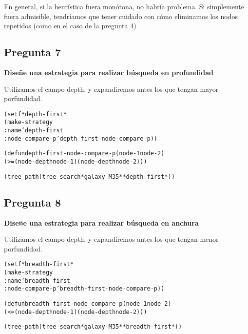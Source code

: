En general, si la heurística fuera monótona, no habría problema. Si simplemente fuera admisible, tendríamos que tener cuidado con cómo eliminamos los nodos repetidos (como en el caso de la pregunta 4)

\subsection*{Pregunta 7}\textbf{Diseñe una estrategia para realizar búsqueda en profundidad}

Utilizamos el campo depth, y expandiremos antes los que tengan mayor porfundidad.
\begin{alltt}
(setf *depth-first*
    (make-strategy
        :name 'depth-first
        :node-compare-p 'depth-first-node-compare-p))

(defun depth-first-node-compare-p (node-1 node-2)
    (>= (node-depth node-1) (node-depth node-2)))

(tree-path (tree-search *galaxy-M35* *depth-first*))
\end{alltt}

\subsection*{Pregunta 8}\textbf{ Diseñe una estrategia para realizar búsqueda en anchura}

Utilizamos el campo depth, y expandiremos antes los que tengan menor porfundidad.

\begin{alltt}
(setf *breadth-first*
    (make-strategy
        :name 'breadth-first
        :node-compare-p 'breadth-first-node-compare-p))

(defun breadth-first-node-compare-p (node-1 node-2)
    (<= (node-depth node-1) (node-depth node-2)))

(tree-path (tree-search *galaxy-M35* *breadth-first*))
\end{alltt}